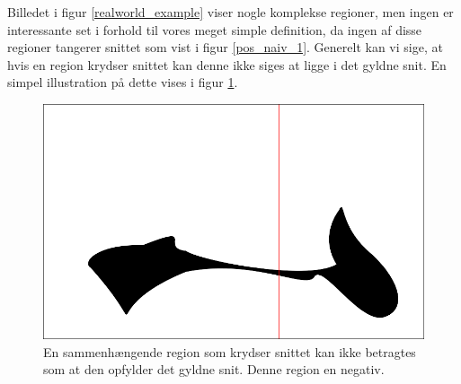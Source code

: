 {Billedet i figur \ref{realworld_example} viser nogle komplekse regioner,
men ingen er interessante set i forhold til vores meget simple
definition, da ingen af disse regioner tangerer snittet som vist i figur
\ref{pos_naiv_1}.  Generelt kan vi sige, at hvis en region krydser
snittet kan denne ikke siges at ligge i det gyldne snit. En simpel
illustration på dette vises i figur \ref{neg_naiv_1}.
\begin{figure}[p]
	\begin{center}
		\includegraphics[scale=\imgscale,angle=0]{afsnit/vores_implementation/billeder/naiv_algoritme/naiv_negativ_blob_2}
	\end{center}
	\caption[En negativt region]{En sammenhængende region som krydser snittet kan ikke
	betragtes som at den opfylder det gyldne snit. Denne region en
	negativ.}
	\label{neg_naiv_1}
\end{figure}

}
